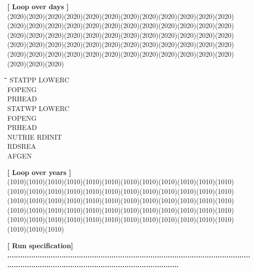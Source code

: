 \documentclass[11pt]{article}
\begin{document}
\strut\hfill {\bf [ Loop over days ]}\\
 \GrBox(2020)\GrBox(2020)\GrBox(2020)\GrBox(2020)\GrBox(2020)\GrBox(2020)\GrBox(2020)\GrBox(2020)\GrBox(2020)\GrBox(2020)\GrBox(2020)\GrBox(2020)\GrBox(2020)\GrBox(2020)\GrBox(2020)\GrBox(2020)\GrBox(2020)\GrBox(2020)\GrBox(2020)\GrBox(2020)\GrBox(2020)\GrBox(2020)\GrBox(2020)\GrBox(2020)\GrBox(2020)\GrBox(2020)\GrBox(2020)\GrBox(2020)\GrBox(2020)\GrBox(2020)\GrBox(2020)\GrBox(2020)\GrBox(2020)\GrBox(2020)\GrBox(2020)\GrBox(2020)\GrBox(2020)\GrBox(2020)\GrBox(2020)\GrBox(2020)\GrBox(2020)\GrBox(2020)\GrBox(2020)\GrBox(2020)\GrBox(2020)\GrBox(2020)\GrBox(2020)\GrBox(2020)\GrBox(2020)\GrBox(2020)\GrBox(2020)\GrBox(2020)\GrBox(2020)\GrBox(2020)\GrBox(2020)\GrBox(2020)\GrBox(2020)\GrBox(2020)\GrBox(2020)\GrBox(2020)\GrBox(2020)\GrBox(2020)\GrBox(2020)\nwln
\begin{tabbing}
\hspace{1.27cm}\=\hspace{1.27cm}\=\hspace{1.27cm}\=\hspace{1.27cm}\=%
\hspace{1.27cm}\=\hspace{1.27cm}\=\hspace{1.27cm}\=\hspace{1.27cm}\=%
\hspace{1.27cm}\=\hspace{1.27cm}\=\kill
\>\> \> \> STATPP\> \> LOWERC\\
\>\> \> \> \> \> FOPENG\\
\>\> \> \> \> \> PRHEAD\\
\>\> \> \> STATWP\> \> LOWERC\\
\>\> \> \> \> \> FOPENG\\
\>\> \> \> \> \> PRHEAD\\
\>\> \> \> NUTRIE\> \> RDINIT\\
\>\> \> \> \> \> RDSREA\\
\>\> \> \> \> \> AFGEN
\end{tabbing}
\strut\hfill {\bf [ Loop over years ]}\\
 \GrBox(1010)\GrBox(1010)\GrBox(1010)\GrBox(1010)\GrBox(1010)\GrBox(1010)\GrBox(1010)\GrBox(1010)\GrBox(1010)\GrBox(1010)\GrBox(1010)\GrBox(1010)\GrBox(1010)\GrBox(1010)\GrBox(1010)\GrBox(1010)\GrBox(1010)\GrBox(1010)\GrBox(1010)\GrBox(1010)\GrBox(1010)\GrBox(1010)\GrBox(1010)\GrBox(1010)\GrBox(1010)\GrBox(1010)\GrBox(1010)\GrBox(1010)\GrBox(1010)\GrBox(1010)\GrBox(1010)\GrBox(1010)\GrBox(1010)\GrBox(1010)\GrBox(1010)\GrBox(1010)\GrBox(1010)\GrBox(1010)\GrBox(1010)\GrBox(1010)\GrBox(1010)\GrBox(1010)\GrBox(1010)\GrBox(1010)\GrBox(1010)\GrBox(1010)\GrBox(1010)\GrBox(1010)\GrBox(1010)\GrBox(1010)\GrBox(1010)\GrBox(1010)\GrBox(1010)\GrBox(1010)\GrBox(1010)\GrBox(1010)\GrBox(1010)\GrBox(1010)\GrBox(1010)\GrBox(1010)\GrBox(1010)\GrBox(1010)\GrBox(1010)\\
\strut\hfill {\bf [ Run specification]}\\
{\bf ...............................................................................................................................................................................................\-}
\end{document}
